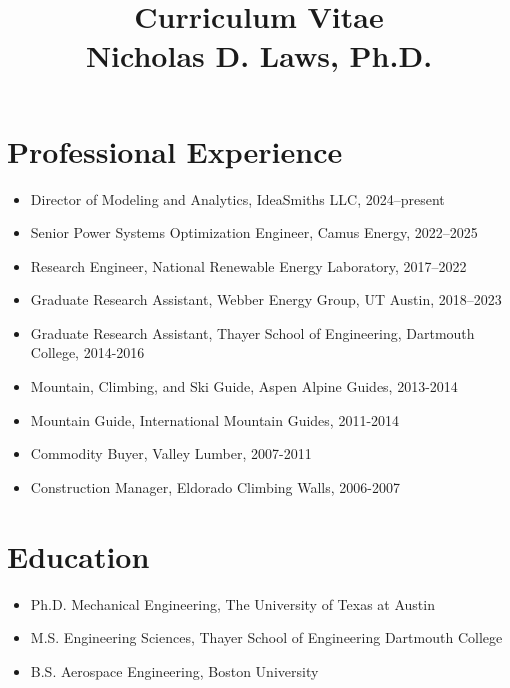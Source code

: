 \documentclass[a4paper,12pt]{report}
\title{\Huge \textbf{Curriculum Vitae\\Nicholas D. Laws, Ph.D.} }
\begin{document}
\maketitle

\tableofcontents
\newpage

\section*{Professional Experience}
\begin{itemize}[leftmargin=*]
    \item Director of Modeling and Analytics, IdeaSmiths LLC, 2024--present
    \item Senior Power Systems Optimization Engineer, Camus Energy, 2022--2025
    \item Research Engineer, National Renewable Energy Laboratory, 2017--2022
    \item Graduate Research Assistant, Webber Energy Group, UT Austin, 2018--2023
    \item Graduate Research Assistant, Thayer School of Engineering, Dartmouth College, 2014-2016
    \item Mountain, Climbing, and Ski Guide, Aspen Alpine Guides, 2013-2014
    \item Mountain Guide, International Mountain Guides, 2011-2014
    \item Commodity Buyer, Valley Lumber, 2007-2011
    \item Construction Manager, Eldorado Climbing Walls, 2006-2007
\end{itemize}


\section*{Education}
\begin{itemize}[leftmargin=*]
    \item Ph.D. Mechanical Engineering, The University of Texas at Austin
    \item M.S. Engineering Sciences, Thayer School of Engineering Dartmouth College
    \item B.S. Aerospace Engineering, Boston University
\end{itemize}
\end{document}
